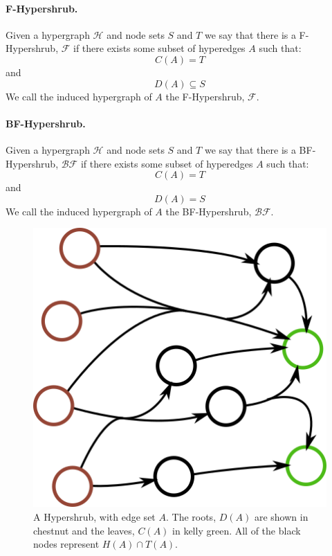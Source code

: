\documentclass[12pt,twoside]{reedthesis}
\theoremstyle{definition}
\begin{document}
\paragraph{F-Hypershrub.}Given a hypergraph $\mathcal{H}$ and node sets $S$ and $T$ we say that there is a F-Hypershrub, $\mathcal{F}$ if there exists some subset of hyperedges $A$ such that:
\begin{equation*}
  C(A) = T
\end{equation*}
and
\begin{equation*}
  D(A) \subseteq S
\end{equation*}
We call the induced hypergraph of $A$ the F-Hypershrub, $\mathcal{F}$.\par
\paragraph{BF-Hypershrub.}Given a hypergraph $\mathcal{H}$ and node sets $S$ and $T$ we say that there is a BF-Hypershrub, $\mathcal{BF}$ if there exists some subset of hyperedges $A$ such that:
\begin{equation*}
  C(A) = T
\end{equation*}
and
\begin{equation*}
  D(A) = S
\end{equation*}
We call the induced hypergraph of $A$ the BF-Hypershrub, $\mathcal{BF}$.\par

\begin{figure}[!h]
  \begin{center}
    \includegraphics[width=5in]{BF-hypershrub}
  \caption[Hypershrub.]{A Hypershrub, with edge set $A$. The roots, $D(A)$ are shown in chestnut and the leaves, $C(A)$ in kelly green. All of the black nodes represent $H(A) \cap T(A)$.}
  \label{fig:BF-hypershrub}
  \end{center}
\end{figure}
\end{document}
